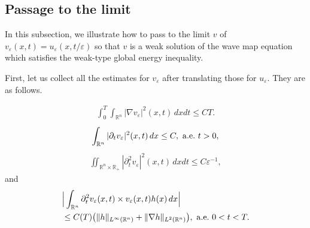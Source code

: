 \documentclass[12pt,twoside,reqno]{amsart}
\theoremstyle{definition}              %
\theoremstyle{remark}                  %
\newcommand{\R}{\mathbb{R}}                 %
\newcommand{\eps}{\varepsilon}
\renewcommand{\1}{\mathbbm{1}}                                      %
\numberwithin{equation}{section}
\numberwithin{definition}{section}
\numberwithin{theorem}{section}
\numberwithin{remark}{section}
\begin{document}
\subsection{Passage to the limit}
In this subsection, we illustrate how to pass to the limit $v$ of $v_\eps(x,t)=u_\eps(x, t/\eps)$ so that
$v$ is a weak solution of the wave map equation which satisfies the weak-type
global energy inequality. 

First, let us collect all the estimates for $v_\eps$ after translating those for $u_\eps$. They are as follows.

\begin{align}\label{H1-est}
\int_0^T \int_{\mathbb{R}^n}
|\nabla v_\eps|^2(x,t)\,dxdt\le CT.
\end{align}
\begin{align}\label{t-derivate-est}
\int_{\mathbb{R}^n}
|\partial_tv_\eps|^2(x,t)\,dx\le C, \ 
{\rm{a.e.}}\ t>0,
\end{align}
\begin{align}\label{tt-derivative-est}
\iint_{\mathbb{R}^n\times\R_+}
|\partial_t^2v_\eps|^2(x,t)\,dxdt\le C\eps^{-1},
\end{align}
and
\begin{align}\label{dual-est3}
&\Big|\int_{\mathbb{R}^n}\partial_t^2v_\eps(x,t)\times v_\eps(x,t) h(x)\,dx\Big|\nonumber\\
&\le C(T)\big(\|h\|_{L^\infty(\mathbb{R}^n)}
+\|\nabla h\|_{L^2(\mathbb{R}^n)}\big),
\ {\rm{a.e.}}\ 0<t<T.
\end{align}
\end{document}
